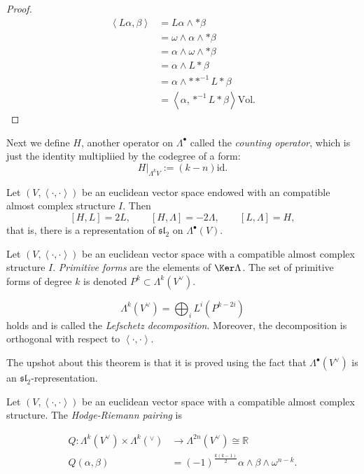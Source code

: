 \documentclass{book}
\begin{document}
\begin{proof}
$$
\begin{aligned}
\left\langle{}L \alpha,\beta\right\rangle{}
&=L \alpha\wedge*\beta\\
&=\omega\wedge\alpha\wedge*\beta\\
&=\alpha\wedge\omega\wedge*\beta\\
&=\alpha\wedge L * \beta\\
&=\alpha\wedge * *^{-1}L * \beta\\
&=\left\langle{}\alpha,*^{-1}L *
\beta\right\rangle{}\text{Vol}.
\end{aligned}
$$
\end{proof}

\noindent
Next we define $H$, another operator on
$\Lambda^\bullet$
called the {\it counting operator},
which is just the identity multipliied by the
codegree of a form:
$$
H|_{\Lambda^kV}:=(k-n)\text{id}.
$$
\begin{proposition}
\label{proposition-sl2-relat-exter-algeb}
Let $(V,\left\langle{}\cdot,\cdot\right\rangle{})$ be an
euclidean vector space
endowed with an compatible almost complex
structure $I$.
Then
$$
[H,L]=2L,\qquad [H,\Lambda]=-2\Lambda,\qquad
[L,\Lambda]=H,
$$
that is, there is a representation of
$\mathfrak{sl}_2$
on $\Lambda^\bullet(V)$.
\end{proposition}

\begin{definition}
\label{definition-primitive-form}
Let $(V,\left\langle{}\cdot,\cdot\right\rangle{})$ be an
euclidean
vector space with a compatible almost complex
structure $I$.
{\it Primitive forms} are the elements of
$\Ker \Lambda$.
The set of primitive forms of degree $k$
is denoted $P^k \subset \Lambda^k(V^\vee)$.
\end{definition}

\begin{theorem}
\label{theorem-lefschetz-decomposition}
$$
\Lambda^k(V^\vee)
=
\bigoplus_i L^i(P^{k-2i})
$$
holds and is called the {\it Lefschetz
decomposition}.
Moreover, the decomposition is orthogonal
with respect to
$\left\langle{}\cdot,\cdot\right\rangle{}$.
\end{theorem}

\noindent
The upshot about this theorem
is that it is proved using the fact
that $\Lambda^\bullet(V^\vee)$ is an
$\mathfrak{sl}_2$-representation.

\begin{definition}
\label{definition-hodge-riemann-pairing}
\begin{reference}
\cite[Definition 1.2.35]{huc}
\end{reference}
Let $(V,\left\langle{}\cdot,\cdot\right\rangle{})$
be an euclidean vector space with a
compatible almost complex structure.
The {\it Hodge-Riemann pairing} is

$$
\begin{aligned}
Q: \Lambda^k(V^\vee)\times \Lambda^k(^\vee)
&\longrightarrow
\Lambda^{2n}(V^\vee)\cong \mathbb{R} \\
Q(\alpha,\beta)&
=(-1)^{\frac{k(k-1)}{2}}
\alpha\wedge\beta\wedge\omega^{n-k}.
\end{aligned}
$$
\end{definition}
\end{document}
